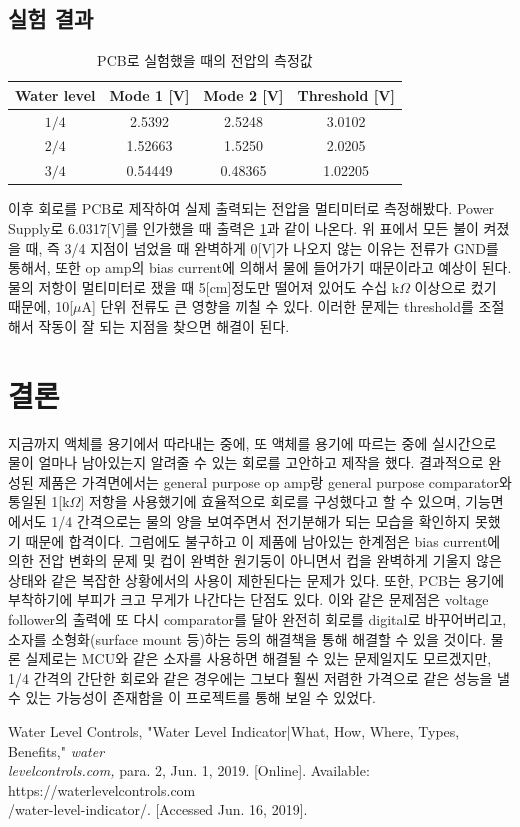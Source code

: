 \documentclass[a4paper,itemph]{oblivoir}
\theoremstyle{definition}
\begin{document}
\subsection{실험 결과}
\begin{table}[htb]
\begin{center}
\begin{tabular}{c|c|c|c}
\hline
     Water level & Mode 1 [V] & Mode 2 [V] & Threshold [V]  \\
     \hline
     $1/4$ & 2.5392 & 2.5248 & 3.0102 \\
     $2/4$ & 1.52663 & 1.5250 & 2.0205 \\
     $3/4$ & 0.54449 & 0.48365 & 1.02205 \\
     \hline
\end{tabular}
\end{center}
\caption{PCB로 실험했을 때의 전압의 측정값}
\label{table:1}
\end{table}
이후 회로를 PCB로 제작하여 실제 출력되는 전압을 멀티미터로 측정해봤다. Power Supply로 6.0317[V]를 인가했을 때 출력은 \ref{table:1}과 같이 나온다. 위 표에서 모든 불이 켜졌을 때, 즉 3/4 지점이 넘었을 때 완벽하게 0[V]가 나오지 않는 이유는 전류가 GND를 통해서, 또한 op amp의 bias current에 의해서 물에 들어가기 때문이라고 예상이 된다. 물의 저항이 멀티미터로 쟀을 때 5[cm]정도만 떨어져 있어도 수십 k$\Omega$ 이상으로 컸기 때문에, 10[$\mu$A] 단위 전류도 큰 영향을 끼칠 수 있다. 이러한 문제는 threshold를 조절해서 작동이 잘 되는 지점을 찾으면 해결이 된다.

\section{결론}
지금까지 액체를 용기에서 따라내는 중에, 또 액체를 용기에 따르는 중에 실시간으로 물이 얼마나 남아있는지 알려줄 수 있는 회로를 고안하고 제작을 했다. 결과적으로 완성된 제품은 가격면에서는 general purpose op amp랑 general purpose comparator와 통일된 1[k$\Omega$] 저항을 사용했기에 효율적으로 회로를 구성했다고 할 수 있으며, 기능면에서도 1/4 간격으로는 물의 양을 보여주면서 전기분해가 되는 모습을 확인하지 못했기 때문에 합격이다. 그럼에도 불구하고 이 제품에 남아있는 한계점은 bias current에 의한 전압 변화의 문제 및 컵이 완벽한 원기둥이 아니면서 컵을 완벽하게 기울지 않은 상태와 같은 복잡한 상황에서의 사용이 제한된다는 문제가 있다. 또한, PCB는 용기에 부착하기에 부피가 크고 무게가 나간다는 단점도 있다. 이와 같은 문제점은 voltage follower의 출력에 또 다시 comparator를 달아 완전히 회로를 digital로 바꾸어버리고, 소자를 소형화(surface mount 등)하는 등의 해결책을 통해 해결할 수 있을 것이다. 물론 실제로는 MCU와 같은 소자를 사용하면 해결될 수 있는 문제일지도 모르겠지만, 1/4 간격의 간단한 회로와 같은 경우에는 그보다 훨씬 저렴한 가격으로 같은 성능을 낼 수 있는 가능성이 존재함을 이 프로젝트를 통해 보일 수 있었다.
\begin{thebibliography}{50}

 Water Level Controls, "Water Level Indicator|What, How, Where, Types, Benefits," \textit{water\\levelcontrols.com,} para. 2, Jun. 1, 2019. [Online]. Available: https://waterlevelcontrols.com\\/water-level-indicator/. [Accessed Jun. 16, 2019].

\end{thebibliography}
\end{document}
